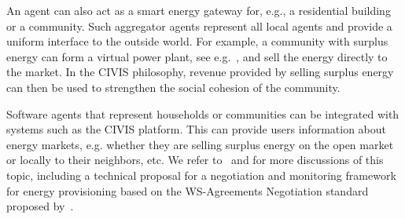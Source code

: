 % 
An agent can also act as a smart energy gateway for, e.g., a residential building %
or a community. 
Such aggregator agents represent all
local agents and provide a uniform interface to the outside world. For example, a community with surplus energy can form a virtual power plant, see e.g.~\cite{pudjianto2007virtual}, and
sell the energy directly to the market. In the CIVIS
philosophy, revenue provided by selling surplus energy can then be
used to strengthen the social cohesion of the community.

Software agents that represent households or communities can
 be integrated with %
systems such as the
CIVIS platform. %
This can provide users information about energy markets, e.g. whether they are 
selling surplus energy on the open market or locally to their
neighbors, etc.
We refer to~\cite{clark2014a} and \cite{clark2014b} for more discussions
of this topic, including a technical proposal for a negotiation and
monitoring framework for energy provisioning based on the
WS-Agreements Negotiation standard proposed by~\cite{waeldrich2011ws}.


